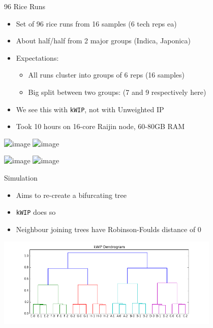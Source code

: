 \documentclass[t]{beamer}
\begin{document}
\begin{frame}{96 Rice Runs}
  \begin{itemize}
    \item Set of 96 rice runs from 16 samples (6 tech reps ea)
    \item About half/half from 2 major groups (Indica, Japonica)
    \item Expectations:
      \begin{itemize}
        \item All runs cluster into groups of 6 reps (16 samples)
        \item Big split between two groups: (7 and 9 respectively here)
      \end{itemize}
    \item We see this with \texttt{kWIP}, not with Unweighted IP
    \item Took 10 hours on 16-core Raijin node, 60-80GB RAM
  \end{itemize}
\end{frame}

\begin{frame}
  \begin{center}
    \includegraphics<1>[width=\textwidth]{img/distmat-both.png}
    \includegraphics<2>[width=\textwidth]{img/dendro-both.png}
  \end{center}
\end{frame}

\begin{frame}
  \begin{center}
    \includegraphics<1>[width=0.6\textwidth]{img/dendro-wip.png}
    \includegraphics<2>[width=0.6\textwidth]{img/dendro-ip.png}
  \end{center}
\end{frame}

\begin{frame}{Simulation}
  \begin{itemize}
    \item Aims to re-create a bifurcating tree
    \item \texttt{kWIP} does so
    \item Neighbour joining trees have Robinson-Foulds distance of 0
  \end{itemize}
  \begin{center}
    \includegraphics[width=0.8\textwidth]{img/kwip-dendro.png}
  \end{center}
\end{frame}
\end{document}
